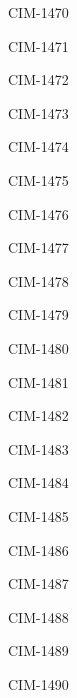\documentclass[]{article}
\begin{document}
\begin{center}
\begin{labels}
CIM-1470


CIM-1471


CIM-1472


CIM-1473


CIM-1474


CIM-1475


CIM-1476


CIM-1477


CIM-1478


CIM-1479


CIM-1480


CIM-1481


CIM-1482


CIM-1483


CIM-1484


CIM-1485


CIM-1486


CIM-1487


CIM-1488


CIM-1489


CIM-1490


CIM-1491


CIM-1492


CIM-1493


CIM-1494


CIM-1495


CIM-1496


CIM-1497


CIM-1498


CIM-1499


CIM-1500


CIM-1501


CIM-1502


CIM-1503


CIM-1504


CIM-1505


CIM-1506


CIM-1507


CIM-1508


CIM-1509


CIM-1510


CIM-1511


CIM-1512


CIM-1513


CIM-1514


CIM-1515


CIM-1516


CIM-1517


CIM-1518


CIM-1519


CIM-1520



\end{labels}
\end{center}
\end{document}
